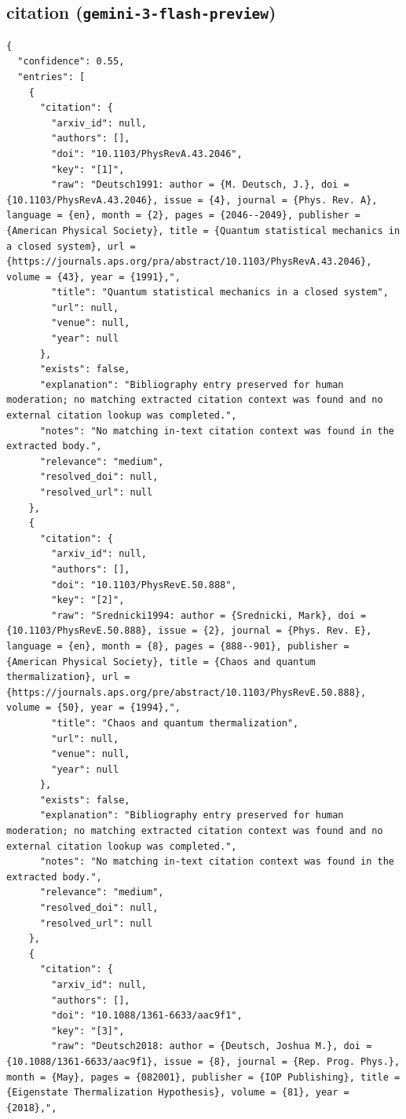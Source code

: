 \documentclass[11pt]{article}
\begin{document}
\subsection*{citation (\texttt{gemini-3-flash-preview})}
\begin{verbatim}
{
  "confidence": 0.55,
  "entries": [
    {
      "citation": {
        "arxiv_id": null,
        "authors": [],
        "doi": "10.1103/PhysRevA.43.2046",
        "key": "[1]",
        "raw": "Deutsch1991: author = {M. Deutsch, J.}, doi = {10.1103/PhysRevA.43.2046}, issue = {4}, journal = {Phys. Rev. A}, language = {en}, month = {2}, pages = {2046--2049}, publisher = {American Physical Society}, title = {Quantum statistical mechanics in a closed system}, url = {https://journals.aps.org/pra/abstract/10.1103/PhysRevA.43.2046}, volume = {43}, year = {1991},",
        "title": "Quantum statistical mechanics in a closed system",
        "url": null,
        "venue": null,
        "year": null
      },
      "exists": false,
      "explanation": "Bibliography entry preserved for human moderation; no matching extracted citation context was found and no external citation lookup was completed.",
      "notes": "No matching in-text citation context was found in the extracted body.",
      "relevance": "medium",
      "resolved_doi": null,
      "resolved_url": null
    },
    {
      "citation": {
        "arxiv_id": null,
        "authors": [],
        "doi": "10.1103/PhysRevE.50.888",
        "key": "[2]",
        "raw": "Srednicki1994: author = {Srednicki, Mark}, doi = {10.1103/PhysRevE.50.888}, issue = {2}, journal = {Phys. Rev. E}, language = {en}, month = {8}, pages = {888--901}, publisher = {American Physical Society}, title = {Chaos and quantum thermalization}, url = {https://journals.aps.org/pre/abstract/10.1103/PhysRevE.50.888}, volume = {50}, year = {1994},",
        "title": "Chaos and quantum thermalization",
        "url": null,
        "venue": null,
        "year": null
      },
      "exists": false,
      "explanation": "Bibliography entry preserved for human moderation; no matching extracted citation context was found and no external citation lookup was completed.",
      "notes": "No matching in-text citation context was found in the extracted body.",
      "relevance": "medium",
      "resolved_doi": null,
      "resolved_url": null
    },
    {
      "citation": {
        "arxiv_id": null,
        "authors": [],
        "doi": "10.1088/1361-6633/aac9f1",
        "key": "[3]",
        "raw": "Deutsch2018: author = {Deutsch, Joshua M.}, doi = {10.1088/1361-6633/aac9f1}, issue = {8}, journal = {Rep. Prog. Phys.}, month = {May}, pages = {082001}, publisher = {IOP Publishing}, title = {Eigenstate Thermalization Hypothesis}, volume = {81}, year = {2018},",

\end{verbatim}
\end{document}
